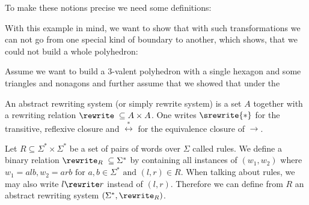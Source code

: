 To make these notions precise we need some definitions:

With this example in mind, we want to show that with such transformations we can not go from one special kind of boundary to another, which shows, that we could not build a whole polyhedron:

\begin{example}
  Assume we want to build a $3$-valent polyhedron with a single hexagon and some triangles and nonagons and further assume that we showed that under the
\end{example}

\begin{definition} An abstract rewriting system (or simply rewrite system) is a set $A$ together with a rewriting relation $\rewrite\; \subseteq A\times A$. One writes $\srewrite{\ast}$ for the transitive, reflexive closure and $\stackrel{\ast}{\leftrightarrow}$ for the equivalence closure of $\to$.
\end{definition}

\begin{definition}\label{def:rewrite:stringrewriting} Let $R \subseteq \Sigma^\ast \times \Sigma^\ast$ be a set of pairs of words over $\Sigma$ called rules. We define a binary relation $\rewrite_R\; \subseteq \Sigma^\ast$ by containing all instances of $(w_1, w_2)$ where $w_1 = a l b, w_2 = a r b \text{ for } a, b \in \Sigma^\ast \text{ and } (l, r) \in R$. When talking about rules, we may also write $l \rewrite r$ instead of $(l, r)$. Therefore we can define from $R$ an abstract rewriting system $(\Sigma^\ast, \rewrite_R)$.
\end{definition}



